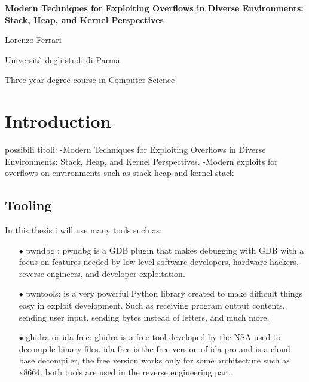 \documentclass{report}
\begin{document}
\begin{titlepage}
    \centering
    \vspace*{\fill}
    \Huge \textbf{Modern Techniques for Exploiting Overflows in Diverse Environments: Stack, Heap, and Kernel Perspectives}
    \vspace{2cm} 
    
    \Large Lorenzo Ferrari

    \vspace{2cm} %
    
    \Large Università degli studi di Parma
    \par
    Three-year degree course in Computer Science
    
 
\end{titlepage}

\renewcommand{\contentsname}{Index}
\tableofcontents
    
    
    
    \chapter{Introduction}
    possibili titoli: \newline
    -Modern Techniques for Exploiting Overflows in Diverse Environments: Stack, Heap, and Kernel Perspectives.
    -Modern exploits for overflows on environments such as stack heap and kernel stack
    \section{Tooling}
    In this thesis i will use many tools such as: 
       \begin{itemize}
        \item[$\bullet$] pwndbg : pwndbg is a GDB plugin that makes debugging with GDB with a focus on features needed by low-level software developers, hardware hackers, reverse engineers, and developer exploitation.\newline
        \item[$\bullet$]pwntools: is a very powerful Python library created to make difficult things easy in exploit development.\newline
        Such as receiving program output contents, sending user input, sending bytes instead of letters, and much more.\newline
        \item[$\bullet$] ghidra or ida free: 
        ghidra is a free tool developed by the NSA used to decompile binary files.
        ida free is the free version of ida pro and is a cloud base decompiler, the free version works only for some architecture such as x8664.\newline
        both tools are used in the reverse engineering part.\newline
    \end{itemize}
    
\end{document}
